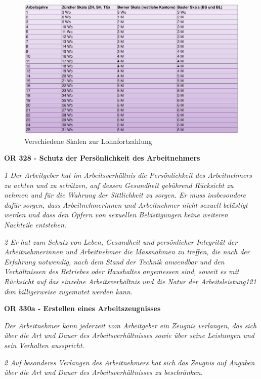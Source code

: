 \begin{figure}
  \centering
  \includegraphics*[width=12cm]{res/arbeitsrecht-lohnfortzahlung-skalen.png}
  \caption{Verschiedene Skalen zur Lohnfortzahlung}
\end{figure}

\noindent
\textbf{OR 328 - Schutz der Persönlichkeit des Arbeitnehmers}

\textit{1 Der Arbeitgeber hat im Arbeitsverhältnis die Persönlichkeit des Arbeitnehmers zu achten und zu schützen, auf dessen Gesundheit gebührend Rücksicht zu nehmen und für die Wahrung der Sittlichkeit zu sorgen. Er muss insbesondere dafür sorgen, dass Arbeitnehmerinnen und Arbeitnehmer nicht sexuell belästigt werden und dass den Opfern von sexuellen Belästigungen keine weiteren Nachteile entstehen.}

\textit{2 Er hat zum Schutz von Leben, Gesundheit und persönlicher Integrität der Arbeitnehmerinnen und Arbeitnehmer die Massnahmen zu treffen, die nach der Erfahrung notwendig, nach dem Stand der Technik anwendbar und den Verhältnissen des Betriebes oder Haushaltes angemessen sind, soweit es mit Rücksicht auf das einzelne Arbeitsverhältnis und die Natur der Arbeitsleistung121 ihm billigerweise zugemutet werden kann.}
\vspace{3mm}

\noindent
\textbf{OR 330a - Erstellen eines Arbeitszeugnisses}

\textit{Der Arbeitnehmer kann jederzeit vom Arbeitgeber ein Zeugnis verlangen, das sich über die Art und Dauer des
Arbeitsverhältnisses sowie über seine Leistungen und sein Verhalten ausspricht.}

\textit{2 Auf besonderes Verlangen des Arbeitnehmers hat sich das Zeugnis auf Angaben über die Art und Dauer des Arbeitsverhältnisses zu beschränken.}
\vspace{3mm}

